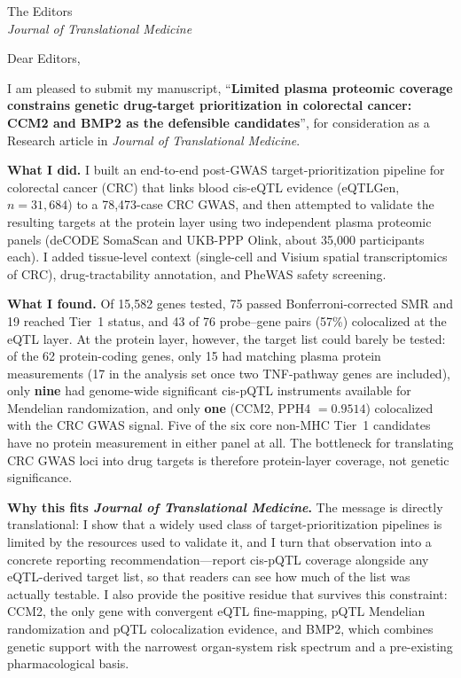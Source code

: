 \documentclass[11pt,a4paper]{letter}
\begin{document}
\begin{letter}{The Editors \\
\textit{Journal of Translational Medicine}}

\opening{Dear Editors,}

I am pleased to submit my manuscript, ``\textbf{Limited plasma proteomic coverage constrains genetic drug-target prioritization in colorectal cancer: CCM2 and BMP2 as the defensible candidates}'', for consideration as a Research article in \textit{Journal of Translational Medicine}.

\textbf{What I did.} I built an end-to-end post-GWAS target-prioritization pipeline for colorectal cancer (CRC) that links blood cis-eQTL evidence (eQTLGen, $n = 31{,}684$) to a 78,473-case CRC GWAS, and then attempted to validate the resulting targets at the protein layer using two independent plasma proteomic panels (deCODE SomaScan and UKB-PPP Olink, about 35,000 participants each). I added tissue-level context (single-cell and Visium spatial transcriptomics of CRC), drug-tractability annotation, and PheWAS safety screening.

\textbf{What I found.} Of 15,582 genes tested, 75 passed Bonferroni-corrected SMR and 19 reached Tier~1 status, and 43 of 76 probe--gene pairs (57\%) colocalized at the eQTL layer. At the protein layer, however, the target list could barely be tested: of the 62 protein-coding genes, only 15 had matching plasma protein measurements (17 in the analysis set once two TNF-pathway genes are included), only \textbf{nine} had genome-wide significant cis-pQTL instruments available for Mendelian randomization, and only \textbf{one} (CCM2, PPH4 $= 0.9514$) colocalized with the CRC GWAS signal. Five of the six core non-MHC Tier~1 candidates have no protein measurement in either panel at all. The bottleneck for translating CRC GWAS loci into drug targets is therefore protein-layer coverage, not genetic significance.

\textbf{Why this fits \textit{Journal of Translational Medicine}.} The message is directly translational: I show that a widely used class of target-prioritization pipelines is limited by the resources used to validate it, and I turn that observation into a concrete reporting recommendation---report cis-pQTL coverage alongside any eQTL-derived target list, so that readers can see how much of the list was actually testable. I also provide the positive residue that survives this constraint: CCM2, the only gene with convergent eQTL fine-mapping, pQTL Mendelian randomization and pQTL colocalization evidence, and BMP2, which combines genetic support with the narrowest organ-system risk spectrum and a pre-existing pharmacological basis.


\end{letter}
\end{document}
